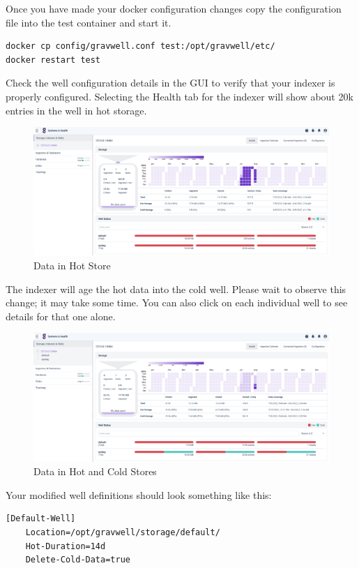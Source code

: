 {{Once you have made your docker configuration changes copy the
configuration file into the test container and start it.

\begin{Verbatim}[breaklines=true]
docker cp config/gravwell.conf test:/opt/gravwell/etc/
docker restart test
\end{Verbatim}

\clearpage
Check the well configuration details in the GUI to verify that your
indexer is properly configured. Selecting the Health tab for the indexer
will show about 20k entries in the  well in hot storage.

\begin{figure}
	\includegraphics{images/hotstore.png}
	\caption{Data in Hot Store}
\end{figure}

The indexer will age the hot data into the cold well. Please wait to
observe this change; it may take some time. You can also
click on each individual well to see details for that one alone.

\begin{figure}
	\includegraphics{images/coldstore.png}
	\caption{Data in Hot and Cold Stores}
\end{figure}

\clearpage
Your modified  well definitions should look something
like this:
\begin{Verbatim}[breaklines=true]
[Default-Well]
    Location=/opt/gravwell/storage/default/
    Hot-Duration=14d
    Delete-Cold-Data=true


\end{Verbatim}}}
